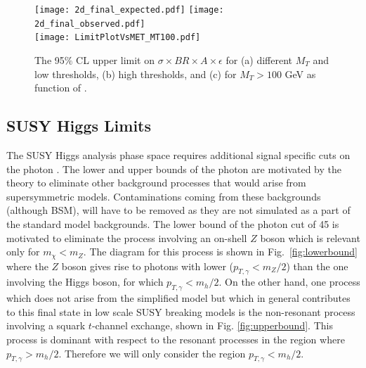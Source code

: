 \begin{figure}[!hp]        
\centering                
{\texttt{[image: 2d\_final\_expected.pdf]}}
{\texttt{[image: 2d\_final\_observed.pdf]}} \\
{\texttt{[image: LimitPlotVsMET\_MT100.pdf]}}
\caption{ The 95$\%$ CL upper limit on $\sigma \times BR\times A\times\epsilon$ for (a) different $M_{T}$ and low \met thresholds, (b) high \met thresholds,  and (c) for $M_{T}> 100$ GeV as function of \met.}
\label{fig:model_lim}
\end{figure}

\subsection{SUSY Higgs Limits}

The SUSY Higgs analysis phase space requires additional signal specific cuts on the photon \pt. The lower and upper bounds of the photon \pt are motivated by the theory to eliminate other background processes that would arise from supersymmetric models. Contaminations coming from these backgrounds (although BSM), will have to be removed as they are not simulated as a part of the standard model backgrounds. The lower bound of the photon \pt cut of 45 \GeV is motivated to eliminate the  process involving an on-shell $Z$ boson which is relevant only for $m_{\chi} <  m_Z$. The diagram for this process is shown in Fig.~\ref{fig:lowerbound} where the $Z$ boson gives rise to photons with lower \pt ($p_{T,\gamma} <  m_Z/2$) than the one involving the Higgs boson, for which $p_{T,\gamma} <  m_h/2$. On the other hand, one process which does not arise from the simplified model but which in general contributes to this final state in low scale SUSY breaking models is the non-resonant process involving a squark $t$-channel exchange, shown in Fig. \ref{fig:upperbound}. This process is dominant with respect to the resonant processes in the region where $p_{T,\gamma} >  m_h/2$.	Therefore we  will only consider the region $p_{T,\gamma} <  m_h/2$.

